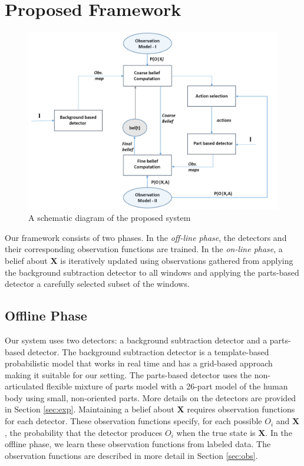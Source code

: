 \documentclass[10pt,twocolumn,letterpaper]{article}
\begin{document}
\section{Proposed Framework}
\begin{figure}
\begin{center}
\includegraphics[width=12cm]{img/blockdia.png}
\end{center}
\caption{A schematic diagram of the proposed system}
\label{fig:Block dia}
\end{figure}
Our framework consists of two phases. In the \emph{off-line phase}, the detectors and their corresponding observation functions are trained. In the \emph{on-line phase}, a belief about $\mathbf{X}$ is iteratively updated using observations gathered from applying the background subtraction detector to all windows and applying the parts-based detector a carefully selected subset of the windows.
\subsection{Offline Phase}
Our system uses two detectors: a background subtraction detector and a parts-based detector. The background subtraction detector is a template-based probabilistic model \cite{englebienne2010fast}  that works in real time and has a grid-based approach making it suitable for our setting. The parts-based detector uses the non-articulated flexible mixture of parts model \cite{partsDeva} with a 26-part model of the human body using small, non-oriented parts.
More details on the detectors are provided in Section \ref{sec:exp}.
Maintaining a belief about $\mathbf{X}$ requires observation functions for each detector. These observation functions specify, for each possible $O_i$ and $\mathbf{X}$, the probability that the detector produces $O_i$ when the true state is $\mathbf{X}$. In the offline phase, we learn these observation functions from labeled data. The observation functions are described in more detail in Section \ref{sec:obs}.
\end{document}

